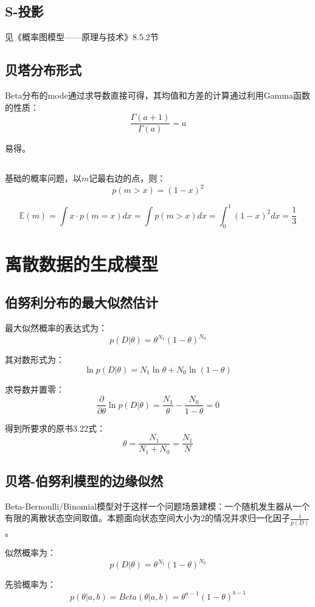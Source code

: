 \documentclass[UTF8]{ctexart}
\begin{document}
\subsection{S-投影}
见《概率图模型——原理与技术》8.5.2节

\subsection{贝塔分布形式}
Beta分布的mode通过求导数直接可得，其均值和方差的计算通过利用Gamma函数的性质：
$$\frac{\Gamma(a+1)}{\Gamma(a)}=a$$

易得。

\subsection{}
基础的概率问题，以$m$记最右边的点，则：
$$p(m>x)=(1-x)^{2}$$

$$\mathbb{E}(m)=\int x\cdot p(m=x)dx=\int p(m>x)dx=\int_{0}^{1}(1-x)^{2}dx=\frac{1}{3}$$



\newpage
\section{离散数据的生成模型}
\subsection{伯努利分布的最大似然估计}
最大似然概率的表达式为：
$$p(D|\theta) = \theta^{N_{1}}(1-\theta)^{N_{0}}$$

其对数形式为：
$$\ln p(D|\theta) = N_{1}\ln \theta + N_{0} \ln (1-\theta)$$

求导数并置零：
$$\frac{\partial}{\partial \theta} \ln p(D|\theta) = \frac{N_{1}}{\theta} -\frac{N_{0}}{1-\theta}=0$$

得到所要求的原书3.22式：
$$\theta = \frac{N_{1}}{N_{1}+N_{0}}=\frac{N_{1}}{N}$$

\subsection{贝塔-伯努利模型的边缘似然}
Beta-Bernoulli/Binomial模型对于这样一个问题场景建模：一个随机发生器从一个有限的离散状态空间取值。本题面向状态空间大小为2的情况并求归一化因子$\frac{1}{p(D)}$。

似然概率为：
$$p(D|\theta) = \theta^{N_{1}}(1-\theta)^{N_{0}}$$

先验概率为：
$$p(\theta|a,b)=Beta(\theta|a,b)=\theta^{a-1}(1-\theta)^{b-1}$$
\end{document}
